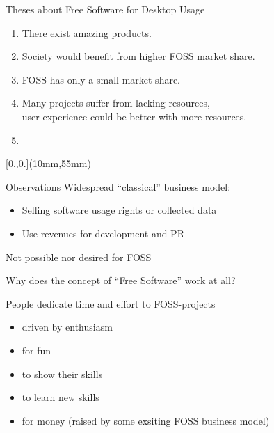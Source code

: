 \documentclass[t]{beamer}
\begin{document}
\begin{frame}[label=obs1]{Theses about Free Software for Desktop Usage}
\begin{enumerate}
\item There exist amazing products.
\pause
\medskip

\item Society would benefit from higher FOSS market share.
\pause
\medskip

\item FOSS has only a small market share.
\pause
\medskip

\item Many projects suffer from lacking resources,\\
user experience could be better with more resources.
\pause
\bigskip
\bigskip

\item
\end{enumerate}


\begin{textblock*}{\textwidth}[0.,0.](10mm,55mm)
\setlength{\breite}{0.9\textwidth}

\end{textblock*}


\end{frame}


\begin{frame}[label=obs2]{Observations}
Widespread ``classical'' business model:
\begin{itemize}
 \item Selling software usage rights or collected data
 \item Use revenues for development and PR
\end{itemize}
\pause
\smallskip
Not possible nor desired for FOSS

\pause
\medskip

{Why does the concept of ``Free Software'' work at all?}

\bigskip
People dedicate time and effort to FOSS-projects
\begin{itemize}
 \item driven by enthusiasm
 \item for fun
 \item to show their skills
 \item to learn new skills
 \bigskip

 \pause
 \item for money (raised by some exsiting FOSS business model)
\end{itemize}


\end{frame}
\end{document}
